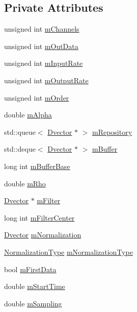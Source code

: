 \subsection*{Private Attributes}
\begin{DoxyCompactItemize}
\item 
unsigned int \hyperlink{classtsa_1_1_b_l_interpolation_a1299ee71922f13c989b9961a0adcd14f}{m\+Channels}
\item 
unsigned int \hyperlink{classtsa_1_1_b_l_interpolation_ab8ea8e129045096ccb53d1b5e6d27329}{m\+Out\+Data}
\item 
unsigned int \hyperlink{classtsa_1_1_b_l_interpolation_a3fc5200b462e9fbd87644f2d5bfa4381}{m\+Input\+Rate}
\item 
unsigned int \hyperlink{classtsa_1_1_b_l_interpolation_a4511cbb0d6e97a901e8d52cffad670a1}{m\+Output\+Rate}
\item 
unsigned int \hyperlink{classtsa_1_1_b_l_interpolation_aa8c5e5637c561ed9b3eabe6b8027e5da}{m\+Order}
\item 
double \hyperlink{classtsa_1_1_b_l_interpolation_a768c64c85e393f975e2caaaba7bc5f90}{m\+Alpha}
\item 
std\+::queue$<$ \hyperlink{namespacetsa_a8900fb03d849baf447a1a0efe2561fb2}{Dvector} $\ast$ $>$ \hyperlink{classtsa_1_1_b_l_interpolation_ab7b685a2b64f9139ca4ea3907f6b0a07}{m\+Repository}
\item 
std\+::deque$<$ \hyperlink{namespacetsa_a8900fb03d849baf447a1a0efe2561fb2}{Dvector} $\ast$ $>$ \hyperlink{classtsa_1_1_b_l_interpolation_ad40701a7e17ce4a2368605c0e77ec6a7}{m\+Buffer}
\item 
long int \hyperlink{classtsa_1_1_b_l_interpolation_a7e179ad859cffc61384efe0bc841255b}{m\+Buffer\+Base}
\item 
double \hyperlink{classtsa_1_1_b_l_interpolation_a21a038009c7323c00263367ca678f767}{m\+Rho}
\item 
\hyperlink{namespacetsa_a8900fb03d849baf447a1a0efe2561fb2}{Dvector} $\ast$ \hyperlink{classtsa_1_1_b_l_interpolation_ab0b2cee3d403a0ae8d3cc3d5c0618f02}{m\+Filter}
\item 
long int \hyperlink{classtsa_1_1_b_l_interpolation_ac7684f2b6ae85030eac7992412df45aa}{m\+Filter\+Center}
\item 
\hyperlink{namespacetsa_a8900fb03d849baf447a1a0efe2561fb2}{Dvector} \hyperlink{classtsa_1_1_b_l_interpolation_a5390ed81fda1345890543a95ab91a6e2}{m\+Normalization}
\item 
\hyperlink{classtsa_1_1_b_l_interpolation_ae11719d30e353da11f076289b87c7b1d}{Normalization\+Type} \hyperlink{classtsa_1_1_b_l_interpolation_aa41a64576f7c0df22870378780d8f73d}{m\+Normalization\+Type}
\item 
bool \hyperlink{classtsa_1_1_b_l_interpolation_adf29f91edc45fbbf8127732fa4b971f0}{m\+First\+Data}
\item 
double \hyperlink{classtsa_1_1_b_l_interpolation_afed34dd05a75cc0eb6ce313a584aa9ef}{m\+Start\+Time}
\item 
double \hyperlink{classtsa_1_1_b_l_interpolation_a76258e5da0c92a792af987a3f2cf972d}{m\+Sampling}
\end{DoxyCompactItemize}


